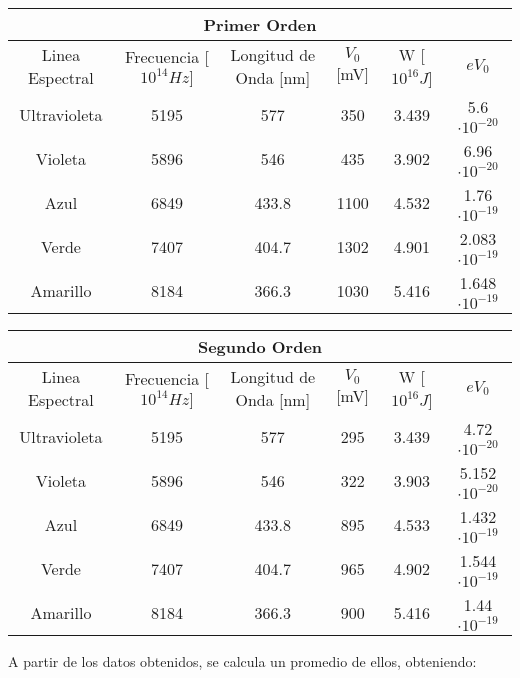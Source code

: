 \documentclass[a4paper,12pt]{report}
\begin{document}
    \begin{table}[htbp!]
        \centering
        \begin{tabular}{|c|c|c|c|c|c|}
        \hline
        \multicolumn{6}{|c|}{Primer Orden} \\
        \hline
        Linea Espectral & Frecuencia [$10^{14} Hz]$ & Longitud de Onda [nm] & $V_0$ [mV]& W [$10^{16} J$] & $eV_0 $\\
        \hline
        Ultravioleta & 5195 & 577 & 350 & 3.439 & 5.6 $\cdot 10^{-20}$ \\
        \hline
        Violeta & 5896 & 546 & 435 & 3.902 & 6.96 $\cdot 10^{-20}$\\
        \hline
        Azul & 6849 & 433.8 & 1100 & 4.532 & 1.76 $\cdot 10^{-19}$\\
        \hline
        Verde & 7407 & 404.7 & 1302 & 4.901 & 2.083 $\cdot 10^{-19}$\\
        \hline
        Amarillo & 8184 & 366.3 & 1030 & 5.416 & 1.648 $\cdot 10^{-19}$\\
        \hline
        \end{tabular}
    \end{table}

    \begin{table}[htbp!]
        \centering
        \begin{tabular}{|c|c|c|c|c|c|}
        \hline
        \multicolumn{6}{|c|}{Segundo Orden} \\
        \hline
        Linea Espectral & Frecuencia [$10^{14} Hz]$ & Longitud de Onda [nm] & $V_0$ [mV]& W [$10^{16} J$] & $eV_0 $\\
        \hline
        Ultravioleta & 5195 & 577 & 295 & 3.439 & 4.72 $\cdot 10^{-20}$\\
        \hline
        Violeta & 5896 & 546 & 322 & 3.903 & 5.152 $\cdot 10^{-20}$\\
        \hline
        Azul & 6849 & 433.8 & 895 & 4.533 & 1.432 $\cdot 10^{-19}$\\
        \hline
        Verde & 7407 & 404.7 & 965 & 4.902 & 1.544 $\cdot 10^{-19}$\\
        \hline
        Amarillo & 8184 & 366.3 & 900 & 5.416 & 1.44 $\cdot 10^{-19}$\\
        \hline
        \end{tabular}
    \end{table}

    A partir de los datos obtenidos, se calcula un promedio de ellos, obteniendo:
\end{document}
